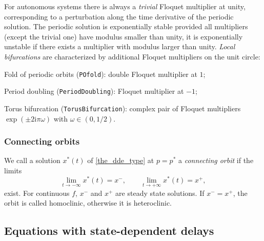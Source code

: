 \documentclass[10pt]{scrartcl}
\newcommand{\define}[1]{\emph{#1}}
\renewcommand{\i}{\mathrm{i}}
\newcommand{\blist}[1]{\mbox{\lstinline!#1!}}
\begin{document}
For autonomous systems there is always a \define{trivial} Floquet
multiplier at unity, corresponding to a perturbation along the time
derivative of the periodic solution. The periodic solution is
exponentially stable provided all multipliers (except the trivial one)
have modulus smaller than unity, it is exponentially unstable if there
exists a multiplier with modulus larger than unity. \emph{Local
  bifurcations} are characterized by additional Floquet multipliers on
the unit circle:
\begin{compactitem}
\item Fold of periodic orbits (\blist{POfold}): double Floquet multiplier at $1$;
\item Period doubling (\blist{PeriodDoubling}): Floquet multiplier at $-1$;
\item Torus bifurcation (\blist{TorusBifurcation}): complex pair of
  Floquet multipliers $\exp(\pm2\i\pi\omega)$ with $\omega\in(0,1/2)$.
\end{compactitem}


\subsubsection{Connecting orbits}
\label{sec:dde:hcli}
We call a solution $x^*(t)$ of \cref{the_dde_type} at $p=p^*$ a 
\textit{connecting orbit} if the limits 
\begin{equation}
\lim_{t\to -\infty} x^*(t)=x^{-}, \qquad \lim_{t\to +\infty} x^*(t)=x^{+},
\end{equation}
exist.  For continuous $f$, $x^-$ and $x^+$ 
are steady state solutions. 
If $x^-=x^+$, the orbit is called homoclinic, otherwise it is heteroclinic. 

\subsection{Equations with state-dependent delays}\label{sd_dde}
\end{document}
